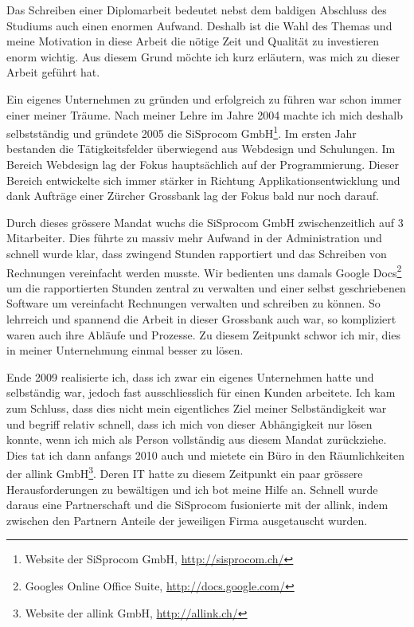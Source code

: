 Das Schreiben einer Diplomarbeit bedeutet nebst dem baldigen Abschluss des Studiums
auch einen enormen Aufwand. Deshalb ist die Wahl des Themas und meine
Motivation in diese Arbeit die nötige Zeit und Qualität zu investieren enorm
wichtig. Aus diesem Grund möchte ich kurz erläutern, was mich zu dieser
Arbeit geführt hat.

Ein eigenes Unternehmen zu gründen und erfolgreich zu führen war schon immer
einer meiner Träume. Nach meiner Lehre im Jahre 2004 machte ich mich deshalb
selbstständig und gründete 2005 die SiSprocom GmbH\footnote{Website der SiSprocom GmbH, \url{http://sisprocom.ch/}}. 
Im ersten Jahr bestanden
die Tätigkeitsfelder überwiegend aus Webdesign und Schulungen. Im Bereich
Webdesign lag der Fokus hauptsächlich auf der Programmierung. Dieser Bereich 
entwickelte sich immer stärker in Richtung 
Applikationsentwicklung und dank Aufträge einer Zürcher Grossbank 
lag der Fokus bald nur noch darauf.

Durch dieses grössere Mandat wuchs die SiSprocom GmbH zwischenzeitlich
auf 3 Mitarbeiter. Dies führte zu massiv mehr Aufwand in der Administration
und schnell wurde klar, dass zwingend Stunden rapportiert und das Schreiben
von Rechnungen vereinfacht werden musste. Wir bedienten uns damals Google 
Docs\footnote{Googles Online Office Suite, \url{http://docs.google.com/}} um die rapportierten Stunden zentral zu 
verwalten und einer selbst geschriebenen Software um vereinfacht Rechnungen 
verwalten und schreiben zu können.
So lehrreich und spannend die Arbeit in dieser Grossbank auch war, so kompliziert
waren auch ihre Abläufe und Prozesse. Zu diesem Zeitpunkt schwor ich mir, dies
in meiner Unternehmung einmal besser zu lösen.

Ende 2009 realisierte ich, dass ich zwar ein eigenes Unternehmen hatte und
selbständig war, jedoch fast ausschliesslich für einen Kunden arbeitete.
Ich kam zum Schluss, dass dies nicht mein eigentliches Ziel meiner Selbständigkeit 
war und begriff
relativ schnell, dass ich mich von dieser Abhängigkeit nur lösen konnte, wenn
ich mich als Person vollständig aus diesem Mandat zurückziehe.
Dies tat ich dann anfangs 2010 auch und mietete ein Büro in den Räumlichkeiten
der allink GmbH\footnote{Website der allink GmbH, \url{http://allink.ch/}}. Deren IT hatte zu diesem Zeitpunkt 
ein paar grössere
Herausforderungen zu bewältigen und ich bot meine Hilfe an. Schnell wurde
daraus eine Partnerschaft und die SiSprocom fusionierte mit der allink, indem zwischen
den Partnern Anteile der jeweiligen Firma ausgetauscht wurden.

